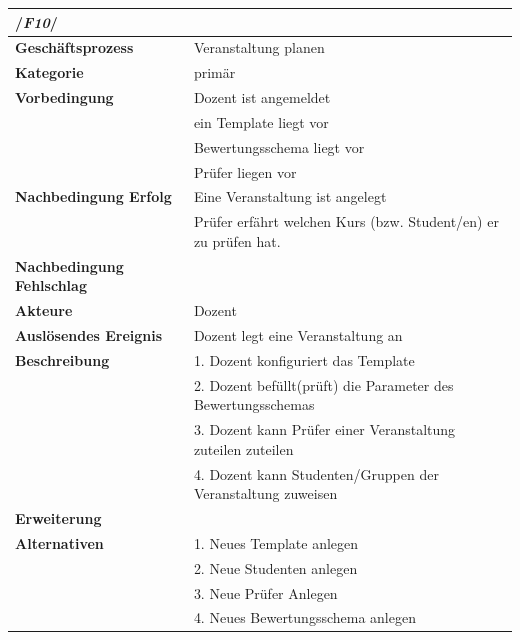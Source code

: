 	\begin{table}[ht]
	\begin{tabular}{ll}
		\multicolumn{2}{l}{/\textbf{\textit{F10}}/}\\\hline
		 \textbf{Geschäftsprozess} & Veranstaltung planen \\ 
		 \textbf{Kategorie} & primär \\ 
		 \textbf{Vorbedingung} & Dozent ist angemeldet\\
		 & ein Template liegt vor \\ 
		  	& Bewertungsschema liegt vor\\
		 	& Prüfer liegen vor\\
		 \textbf{Nachbedingung Erfolg} & Eine Veranstaltung ist angelegt  \\ 
		 & Prüfer erfährt welchen Kurs (bzw.  Student/en) er zu prüfen hat.\\
		 \textbf{Nachbedingung Fehlschlag} &  \\ 
		 \textbf{Akteure} & Dozent \\ 
		 \textbf{Auslösendes Ereignis} & Dozent legt eine Veranstaltung an  \\ 
		 \textbf{Beschreibung} &  1. Dozent konfiguriert das Template\\ 
		 & 2. Dozent befüllt(prüft) die Parameter des Bewertungsschemas\\
		 & 3. Dozent kann Prüfer einer Veranstaltung zuteilen zuteilen \\
		 & 4. Dozent kann Studenten/Gruppen der  Veranstaltung zuweisen\\
		  \textbf{Erweiterung} &  \\ 
		 \textbf{Alternativen} & 1. Neues Template anlegen \\
		 & 2. Neue Studenten anlegen\\
		 & 3. Neue Prüfer Anlegen \\
		 & 4. Neues Bewertungsschema anlegen
		 \end{tabular} 
	\label{tab:F10}
	\end{table}
	
